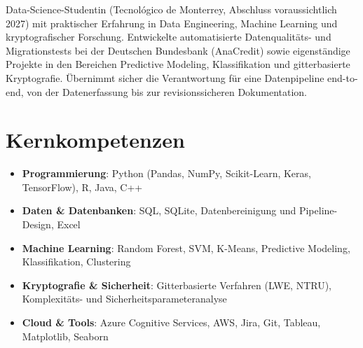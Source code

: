 \documentclass[11pt,a4paper,sans]{moderncv}
\begin{document}
\makecvtitle


\vspace{6pt}
\small{Data-Science-Studentin (Tecnológico de Monterrey, Abschluss voraussichtlich 2027) mit praktischer Erfahrung in Data Engineering, Machine Learning und kryptografischer Forschung. Entwickelte automatisierte Datenqualitäts- und Migrationstests bei der Deutschen Bundesbank (AnaCredit) sowie eigenständige Projekte in den Bereichen Predictive Modeling, Klassifikation und gitterbasierte Kryptografie. Übernimmt sicher die Verantwortung für eine Datenpipeline end-to-end, von der Datenerfassung bis zur revisionssicheren Dokumentation.}


\section{Kernkompetenzen}
\vspace{1pt}
\begin{itemize}

\item \textbf{Programmierung}: Python (Pandas, NumPy, Scikit-Learn, Keras, TensorFlow), R, Java, C++

\item \textbf{Daten \& Datenbanken}: SQL, SQLite, Datenbereinigung und Pipeline-Design, Excel

\item \textbf{Machine Learning}: Random Forest, SVM, K-Means, Predictive Modeling, Klassifikation, Clustering

\item \textbf{Kryptografie \& Sicherheit}: Gitterbasierte Verfahren (LWE, NTRU), Komplexitäts- und Sicherheitsparameteranalyse

\item \textbf{Cloud \& Tools}: Azure Cognitive Services, AWS, Jira, Git, Tableau, Matplotlib, Seaborn

\end{itemize}

\end{document}
